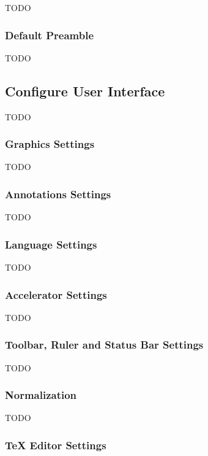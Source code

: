 TODO


\subsubsection{Default Preamble}\label{sec:texconfigpreamble}

TODO


\subsection{Configure User Interface}\label{sec:configureuidialog}

TODO


\subsubsection{Graphics Settings}\label{sec:graphics}

TODO


\subsubsection{Annotations Settings}\label{sec:annotations}

TODO


\subsubsection{Language Settings}\label{sec:languages}

TODO


\subsubsection{Accelerator Settings}\label{sec:accelerators}

TODO


\subsubsection{Toolbar, Ruler and Status Bar Settings}\label{sec:rulers}

TODO


\subsubsection{Normalization}\label{sec:normalize}

TODO


\subsubsection{TeX Editor Settings}\label{sec:texeditorui}

